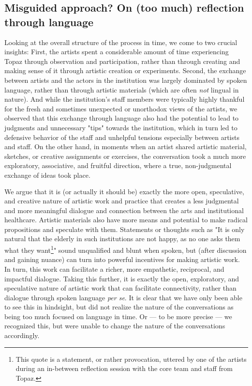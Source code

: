 \documentclass[authordate, empirical,issue]{jote-new-article}
\begin{document}
{	\subsection{Misguided approach? On (too much) reflection through language}



	Looking at the overall structure of the process in time, we come to two crucial insights: First, the artists spent a considerable amount of time experiencing Topaz through observation and participation, rather than through creating and making sense of it through artistic creation or experiments. Second, the exchange between artists and the actors in the institution was largely dominated by spoken language, rather than through artistic materials (which are often \emph{not} lingual in nature). And while the institution's staff members were typically highly thankful for the fresh and sometimes unexpected or unorthodox views of the artists, we observed that this exchange through language also had the potential to lead to judgments and unnecessary "tips" towards the institution, which in turn led to defensive behavior of the staff and unhelpful tensions especially between artists and staff. On the other hand, in moments when an artist shared artistic material, sketches, or creative assignments or exercises, the conversation took a much more exploratory, associative, and fruitful direction, where a true, non-judgmental exchange of ideas took place.







	We argue that it is (or actually it should be) exactly the more open, speculative, and creative nature of artistic work and practice that creates a less judgmental and more meaningful dialogue and connection between the arts and institutional healthcare. Artistic materials also have more means and potential to make radical propositions and speculate with them. Statements or thoughts such as "It is only natural that the elderly in such institutions are not happy, as no one asks them what they want\footnote{This quote is a statement, or rather provocation, uttered by one of the artists during an in-between reflection session with the core team and staff from Topaz.}" sound unqualified and blunt when spoken, but (after discussion and gaining nuance) can turn into powerful incentives for making artistic work. In turn, this work can facilitate a richer, more empathetic, reciprocal, and impactful dialogue. Taking this further, it is exactly the open, exploratory, and speculative nature of artistic work that can facilitate connectivity, rather than dialogue through spoken language \emph{per se}. It is clear that we have only been able to see this in hindsight, but did not realize the nature of the conversations as being too much focused on language in time. Or --- to be more precise --- we recognized this, but were unable to change the nature of the conversations accordingly.







}
\end{document}
